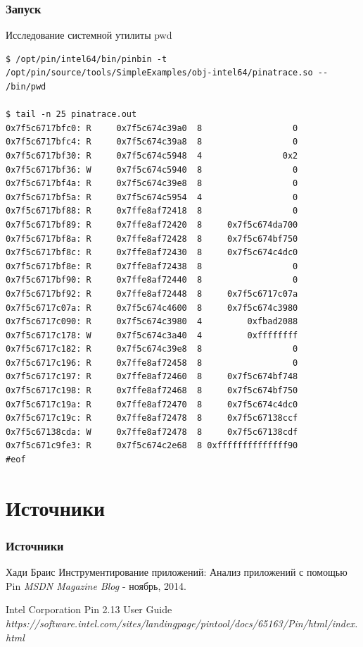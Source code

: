 \documentclass{beamer}
\begin{document}
\begin{frame}[fragile] %
\frametitle{Запуск}
\begin{block}{Исследование системной утилиты pwd}
\begin{verbatim}
$ /opt/pin/intel64/bin/pinbin -t /opt/pin/source/tools/SimpleExamples/obj-intel64/pinatrace.so -- /bin/pwd

$ tail -n 25 pinatrace.out 
0x7f5c6717bfc0: R     0x7f5c674c39a0  8                  0
0x7f5c6717bfc4: R     0x7f5c674c39a8  8                  0
0x7f5c6717bf30: R     0x7f5c674c5948  4                0x2
0x7f5c6717bf36: W     0x7f5c674c5940  8                  0
0x7f5c6717bf4a: R     0x7f5c674c39e8  8                  0
0x7f5c6717bf5a: R     0x7f5c674c5954  4                  0
0x7f5c6717bf88: R     0x7ffe8af72418  8                  0
0x7f5c6717bf89: R     0x7ffe8af72420  8     0x7f5c674da700
0x7f5c6717bf8a: R     0x7ffe8af72428  8     0x7f5c674bf750
0x7f5c6717bf8c: R     0x7ffe8af72430  8     0x7f5c674c4dc0
0x7f5c6717bf8e: R     0x7ffe8af72438  8                  0
0x7f5c6717bf90: R     0x7ffe8af72440  8                  0
0x7f5c6717bf92: R     0x7ffe8af72448  8     0x7f5c6717c07a
0x7f5c6717c07a: R     0x7f5c674c4600  8     0x7f5c674c3980
0x7f5c6717c090: R     0x7f5c674c3980  4         0xfbad2088
0x7f5c6717c178: W     0x7f5c674c3a40  4         0xffffffff
0x7f5c6717c182: R     0x7f5c674c39e8  8                  0
0x7f5c6717c196: R     0x7ffe8af72458  8                  0
0x7f5c6717c197: R     0x7ffe8af72460  8     0x7f5c674bf748
0x7f5c6717c198: R     0x7ffe8af72468  8     0x7f5c674bf750
0x7f5c6717c19a: R     0x7ffe8af72470  8     0x7f5c674c4dc0
0x7f5c6717c19c: R     0x7ffe8af72478  8     0x7f5c67138ccf
0x7f5c67138cda: W     0x7ffe8af72478  8     0x7f5c67138cdf
0x7f5c671c9fe3: R     0x7f5c674c2e68  8 0xffffffffffffff90
#eof
\end{verbatim}
\end{block}

\end{frame}

\section{Источники}

\begin{frame}
\frametitle{Источники}
\footnotesize{
\begin{thebibliography}{99} %
 Хади Браис
\newblock Инструментирование приложений: Анализ приложений с помощью Pin
\newblock \emph{MSDN Magazine Blog} - ноябрь, 2014.
\end{thebibliography}

\begin{thebibliography}{98}
 Intel Corporation
\newblock Pin 2.13 User Guide
\newblock \emph{https://software.intel.com/sites/landingpage/pintool/docs/65163/Pin/html/index.html}
\end{thebibliography}
}
\end{frame}
\end{document}
